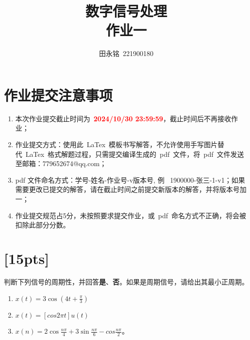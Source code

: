 \documentclass[a4paper,UTF8]{article}
\numberwithin{equation}{section}
\begin{document}
\title{数字信号处理\\
    作业一}
\author{田永铭\, 221900180}
\maketitle

\section*{作业提交注意事项}
\begin{tcolorbox}
    \begin{enumerate}
       \item[(1)] 本次作业提交截止时间为~\textcolor{red}{\textbf{2024/10/30  23:59:59}}，截止时间后不再接收作业；
        \item[(2)] 作业提交方式：使用此~LaTex~模板书写解答，不允许使用手写图片替代~LaTex~格式解题过程，只需提交编译生成的~pdf~文件，将~pdf~文件发送至邮箱：779652674@qq.com；
        \item[(3)] pdf 文件命名方式：学号-姓名-作业号-v版本号, 例~ 1900000-张三-1-v1；如果需要更改已提交的解答，请在截止时间之前提交新版本的解答，并将版本号加一；
        \item[(4)] 作业提交规范占5分，未按照要求提交作业，或~pdf~命名方式不正确，将会被扣除此部分分数。

    \end{enumerate}
\end{tcolorbox}

\newpage
\section{[15pts]}
判断下列信号的周期性，并回答\textbf{是}、\textbf{否}。如果是周期信号，请给出其最小正周期。
\begin{enumerate}[(1)]
    \item $x(t)=3\cos(4t+\frac{\pi}3)$
    \item $x(t)=[cos 2\pi t]u(t)$
    \item $x(n)=2\cos \frac{n\pi}{4}+3\sin \frac{n\pi}{6}-cos \frac{n\pi}{2}$。
\end{enumerate}
\end{document}
